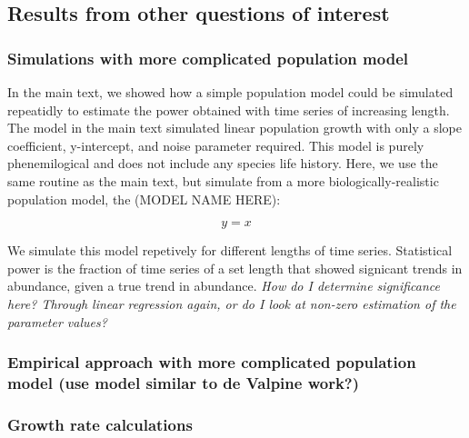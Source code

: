 \documentclass[12pt,]{article}
\begin{document}
\pagebreak

\subsection{Results from other questions of
interest}\label{results-from-other-questions-of-interest}

\subsubsection{Simulations with more complicated population
model}\label{simulations-with-more-complicated-population-model}

In the main text, we showed how a simple population model could be
simulated repeatidly to estimate the power obtained with time series of
increasing length. The model in the main text simulated linear
population growth with only a slope coefficient, y-intercept, and noise
parameter required. This model is purely phenemilogical and does not
include any species life history. Here, we use the same routine as the
main text, but simulate from a more biologically-realistic population
model, the (MODEL NAME HERE):

\begin{equation}
    y = x
  \end{equation}

We simulate this model repetively for different lengths of time series.
Statistical power is the fraction of time series of a set length that
showed signicant trends in abundance, given a true trend in abundance.
\emph{How do I determine significance here? Through linear regression
again, or do I look at non-zero estimation of the parameter values?}

\subsubsection{Empirical approach with more complicated population model
(use model similar to de Valpine
work?)}\label{empirical-approach-with-more-complicated-population-model-use-model-similar-to-de-valpine-work}

\subsubsection{Growth rate calculations}\label{growth-rate-calculations}
\end{document}
